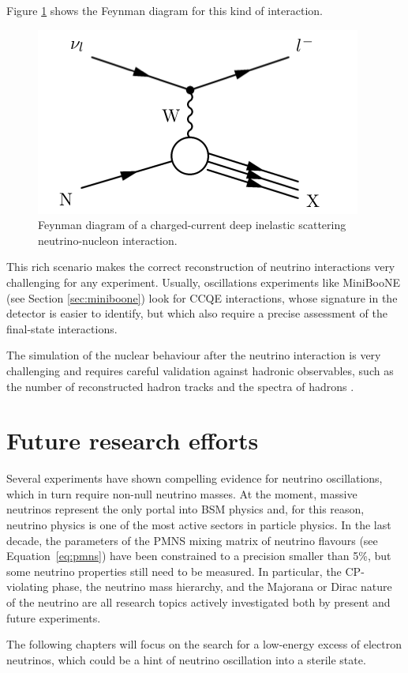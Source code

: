 \begin{description}
Figure \ref{fig:ccdis_feyn} shows the Feynman diagram for this kind of interaction.

\begin{figure}[htbp]
    \centering
    \includegraphics[width=0.65\linewidth]{figures/ccdis_feyn.png}
    \caption{Feynman diagram of a charged-current deep inelastic scattering neutrino-nucleon interaction.}
    \label{fig:ccdis_feyn}
\end{figure}


\end{description}

This rich scenario makes the correct reconstruction of neutrino interactions very challenging for any experiment. Usually, oscillations experiments like MiniBooNE (see Section \ref{sec:miniboone}) look for CCQE interactions, whose signature in the detector is easier to identify, but which also require a precise assessment of the final-state interactions. \begin{mccorrection}
The simulation of the nuclear behaviour after the neutrino interaction is very challenging and requires careful validation against hadronic observables, such as the number of reconstructed hadron tracks and the spectra of hadrons \cite{Golan:2012wx}.
\end{mccorrection}


\section{Future research efforts}
Several experiments have shown compelling evidence for neutrino oscillations, which in turn require non-null neutrino masses. At the moment, massive neutrinos represent the only portal into BSM physics and, for this reason, neutrino physics is one of the most active sectors in particle physics. In the last decade, the parameters of the PMNS mixing matrix of neutrino flavours (see Equation~\ref{eq:pmns}) have been constrained to a precision smaller than 5\%, but some neutrino properties still need to be measured. In particular, the CP-violating phase, the neutrino mass hierarchy, and the Majorana or Dirac nature of the neutrino are all research topics actively investigated both by present and future experiments. 


The following chapters will focus on the search for a low-energy excess of electron neutrinos, which could be a hint of neutrino oscillation into a sterile state. 